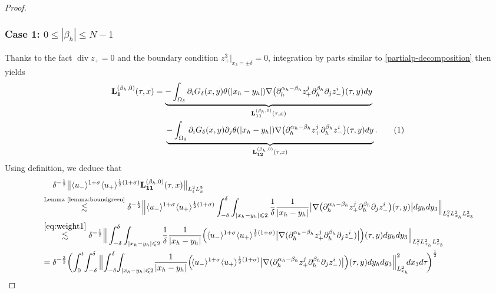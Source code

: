 \documentclass[10pt,reqno]{amsart}
\numberwithin{equation}{section}
\begin{document}
\begin{proof}
	\subsubsection*{\bf Case 1:  $0\leqslant|\beta_h|\leqslant N-1$}
	Thanks to the fact $\operatorname{div}z_+=0$ and the boundary condition $ z^3_{+}|_{x_3=\pm\delta}=0$, integration by parts similar to \eqref{partialp-decomposition} then yields
	\begin{align*}
		\mathbf{L}_{\mathbf{1}}^{(\beta_h,0)}(\tau,x)
		&= \underbrace{-\int_{\Omega_\delta}\partial_i G_\delta(x,y)\theta(|x_h-y_h|)\nabla\big(\partial_{h}^{\alpha_h-\beta_h}z_+^j\partial_{h}^{\beta_h}\partial_jz_-^i\big)(\tau,y)dy}_{ \mathbf{L}_{\mathbf{11}}^{(\beta_h,0)}(\tau,x)}\\
		&\ \ \ \   \underbrace{-\int_{\Omega_\delta}\partial_i G_\delta(x,y)\partial_j\theta(|x_h-y_h|)\nabla\big(\partial_{h}^{\alpha_h-\beta_h}z_+^j\partial_{h}^{\beta_h}z_-^i\big)(\tau,y)dy}_{ \mathbf{L}_{\mathbf{12}}^{(\beta_h,0)}(\tau,x)}.\stepcounter{equation}\tag{\theequation}\label{eqH1-decomposition}
	\end{align*}
	Using definition, we deduce that  
	\begin{align*}
		&\ \ \ \ \delta^{-\frac{1}{2}}\big\|\langle u_-\rangle^{1+\sigma}\langle u_+\rangle^{\frac{1}{2}(1+\sigma)}\mathbf{L}_{\mathbf{11}}^{(\beta_h,0)}(\tau,x)\big\|_{L^2_tL^2_x}\\
		&\stackrel{\text{Lemma \ref{lemma:boundgreen}}}{\lesssim}\delta^{-\frac{1}{2}}\Big\|\langle u_-\rangle^{1+\sigma}\langle u_+\rangle^{\frac{1}{2}(1+\sigma)}\int_{-\delta}^{\delta}\int_{|x_h-y_h|\leqslant 2}\frac{1}{\delta}\frac{1}{|x_h-y_h|} \big|\nabla\big(\partial_{h}^{\alpha_h-\beta_h}z_+^j\partial_{h}^{\beta_h}\partial_jz_-^i\big)(\tau,y)\big|dy_hdy_3\Big\|_{L^2_tL^2_{x_h}L^2_{x_3}}\\
		&\stackrel{\eqref{eq:weight1}}{\lesssim}\delta^{-\frac{1}{2}}\Big\|\int_{-\delta}^{\delta}\int_{|x_h-y_h|\leqslant 2}\frac{1}{\delta}\frac{1}{|x_h-y_h|} \Big(\langle u_-\rangle^{1+\sigma}\langle u_+\rangle^{\frac{1}{2}(1+\sigma)}\big|\nabla(\partial_{h}^{\alpha_h-\beta_h}z_+^j\partial_{h}^{\beta_h}\partial_jz_-^i)\big|\Big)(\tau,y)dy_hdy_3\Big\|_{L^2_tL^2_{x_h}L^2_{x_3}}\\
		&=\delta^{-\frac{3}{2}}\bigg(\!\int_0^t\!\int_{-\delta}^{\delta}\Big\|\!\int_{-\delta}^{\delta}\!\int_{|x_h-y_h|\leqslant 2}\!\frac{1}{|x_h-y_h|} \Big(\!\langle u_-\rangle^{1+\sigma}\langle u_+\rangle^{\frac{1}{2}(1+\sigma)}\big|\nabla(\partial_{h}^{\alpha_h-\beta_h}z_+^j\partial_{h}^{\beta_h}\partial_jz_-^i)\big|\Big)(\tau,y)dy_hdy_3\Big\|^2_{L^2_{x_h}}\!\!dx_3d\tau\!\bigg)^{\frac{1}{2}}\\

\end{align*}
\end{proof}
\end{document}
